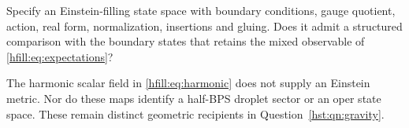 \begin{question}\label{hfill:qn:Einstein}
Specify an Einstein-filling state space with boundary conditions,
gauge quotient, action, real form, normalization, insertions and gluing.
Does it admit a structured comparison with the boundary states that
retains the mixed observable of \eqref{hfill:eq:expectations}?
\end{question}

The harmonic scalar field in \eqref{hfill:eq:harmonic} does not supply
an Einstein metric. Nor do these maps identify a half-BPS droplet sector
or an oper state space. These remain distinct geometric
recipients in Question~\ref{hst:qn:gravity}.

